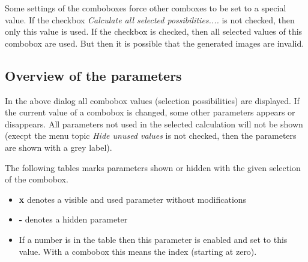 \documentclass[11pt]{article} %
\begin{document}
Some settings of the comboboxes force other comboxes to be set to a special value. If the checkbox {\it Calculate all selected possibilities....} is not checked, then only this value is used. If the checkbox is checked, then all selected values of this combobox are used. But then it is possible that the generated images are invalid.



\subsection{Overview of the parameters}

In the above dialog all combobox values (selection possibilities) are displayed. If the current value of a combobox is changed, some other parameters appears or disappears. All parameters not used in the selected calculation will not be shown (execpt the menu topic {\it Hide unused values} is not checked, then the parameters are shown with a grey label).

The following tables marks parameters shown or hidden with the given selection of the combobox.
\begin{itemize}\itemsep0pt
\item {\bf x} denotes a visible and used parameter without modifications
\item {\bf -} denotes a hidden parameter
\item If a number is in the table then this parameter is enabled and set to this value. With a combobox this means the index (starting at zero).
\end{itemize}
\end{document}
